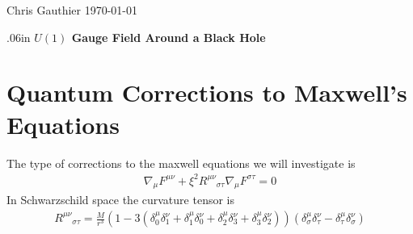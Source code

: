 \documentclass[12pt]{article}
\begin{document}
\begin{flushright}
Chris Gauthier
\today
\end{flushright}
\begin{center} 
\vglue .06in
{\Large \bf {$U(1)$ Gauge Field Around a Black Hole}}\\[.5in]

\end{center}
\section{Quantum Corrections to Maxwell's Equations}
The type of corrections to the maxwell equations we will investigate is
\begin{gather}
\nabla_{\mu}F^{\mu\nu}
+
\xi^{2}
R^{\mu\nu}_{\,\,\,\,\,\,\, \sigma \tau}
\nabla_{\mu}
F^{\sigma \tau}
=0
\end{gather}
In Schwarzschild space the curvature tensor is
\begin{gather}
R^{\mu\nu}_{\,\,\,\,\,\,\, \sigma \tau}
=
\frac{M}{r^{3}}
\left(
1
-
3 (\delta^{\mu}_{0}\delta^{\nu}_{1} + \delta^{\mu}_{1}\delta^{\nu}_{0} + \delta^{\mu}_{2}\delta^{\nu}_{3} + \delta^{\mu}_{3}\delta^{\nu}_{2})
\right)
(\delta^{\mu}_{\sigma} \delta^{\nu}_{\tau} - \delta^{\mu}_{\tau} \delta^{\nu}_{\sigma})
\end{gather}
\end{document}
